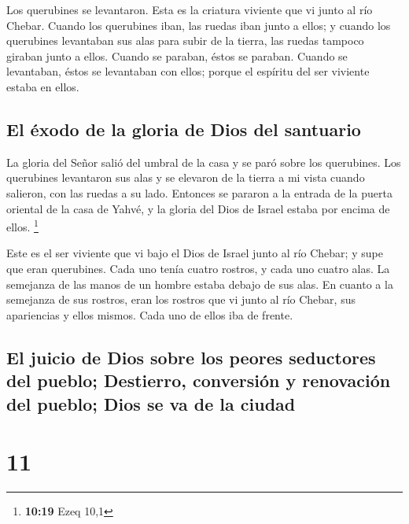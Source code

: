  Los querubines se levantaron. Esta es la criatura
viviente que vi junto al río Chebar.  Cuando los
querubines iban, las ruedas iban junto a ellos; y cuando los querubines
levantaban sus alas para subir de la tierra, las ruedas tampoco giraban
junto a ellos.  Cuando se paraban, éstos se paraban.
Cuando se levantaban, éstos se levantaban con ellos; porque el espíritu
del ser viviente estaba en ellos.

\hypertarget{el-uxe9xodo-de-la-gloria-de-dios-del-santuario}{%
\subsection{El éxodo de la gloria de Dios del
santuario}\label{el-uxe9xodo-de-la-gloria-de-dios-del-santuario}}

 La gloria del Señor salió del umbral de la casa y se
paró sobre los querubines.  Los querubines levantaron sus
alas y se elevaron de la tierra a mi vista cuando salieron, con las
ruedas a su lado. Entonces se pararon a la entrada de la puerta oriental
de la casa de Yahvé, y la gloria del Dios de Israel estaba por encima de
ellos. \footnote{\textbf{10:19} Ezeq 10,1}

 Este es el ser viviente que vi bajo el Dios de Israel
junto al río Chebar; y supe que eran querubines.  Cada
uno tenía cuatro rostros, y cada uno cuatro alas. La semejanza de las
manos de un hombre estaba debajo de sus alas.  En cuanto
a la semejanza de sus rostros, eran los rostros que vi junto al río
Chebar, sus apariencias y ellos mismos. Cada uno de ellos iba de frente.

\hypertarget{el-juicio-de-dios-sobre-los-peores-seductores-del-pueblo-destierro-conversiuxf3n-y-renovaciuxf3n-del-pueblo-dios-se-va-de-la-ciudad}{%
\subsection{El juicio de Dios sobre los peores seductores del pueblo;
Destierro, conversión y renovación del pueblo; Dios se va de la
ciudad}\label{el-juicio-de-dios-sobre-los-peores-seductores-del-pueblo-destierro-conversiuxf3n-y-renovaciuxf3n-del-pueblo-dios-se-va-de-la-ciudad}}

\hypertarget{section-10}{%
\section{11}\label{section-10}}

